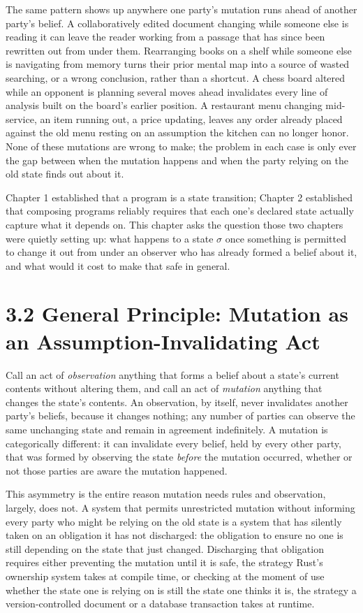 \documentclass[11pt]{book}
\begin{document}
The same pattern shows up anywhere one party's mutation runs ahead of another party's belief. A collaboratively edited document changing while someone else is reading it can leave the reader working from a passage that has since been rewritten out from under them. Rearranging books on a shelf while someone else is navigating from memory turns their prior mental map into a source of wasted searching, or a wrong conclusion, rather than a shortcut. A chess board altered while an opponent is planning several moves ahead invalidates every line of analysis built on the board's earlier position. A restaurant menu changing mid-service, an item running out, a price updating, leaves any order already placed against the old menu resting on an assumption the kitchen can no longer honor. None of these mutations are wrong to make; the problem in each case is only ever the gap between when the mutation happens and when the party relying on the old state finds out about it.

Chapter 1 established that a program is a state transition; Chapter 2 established that composing programs reliably requires that each one's declared state actually capture what it depends on. This chapter asks the question those two chapters were quietly setting up: what happens to a state $\sigma$ once something is permitted to change it out from under an observer who has already formed a belief about it, and what would it cost to make that safe in general.

\section*{3.2 General Principle: Mutation as an Assumption-Invalidating Act}

Call an act of \emph{observation} anything that forms a belief about a state's current contents without altering them, and call an act of \emph{mutation} anything that changes the state's contents. An observation, by itself, never invalidates another party's beliefs, because it changes nothing; any number of parties can observe the same unchanging state and remain in agreement indefinitely. A mutation is categorically different: it can invalidate every belief, held by every other party, that was formed by observing the state \emph{before} the mutation occurred, whether or not those parties are aware the mutation happened.

This asymmetry is the entire reason mutation needs rules and observation, largely, does not. A system that permits unrestricted mutation without informing every party who might be relying on the old state is a system that has silently taken on an obligation it has not discharged: the obligation to ensure no one is still depending on the state that just changed. Discharging that obligation requires either preventing the mutation until it is safe, the strategy Rust's ownership system takes at compile time, or checking at the moment of use whether the state one is relying on is still the state one thinks it is, the strategy a version-controlled document or a database transaction takes at runtime.
\end{document}
